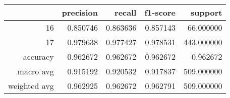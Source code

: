 \begin{tabular}{rrrrr}
\toprule
 & precision & recall & f1-score & support \\
\midrule
16 & 0.850746 & 0.863636 & 0.857143 & 66.000000 \\
17 & 0.979638 & 0.977427 & 0.978531 & 443.000000 \\
accuracy & 0.962672 & 0.962672 & 0.962672 & 0.962672 \\
macro avg & 0.915192 & 0.920532 & 0.917837 & 509.000000 \\
weighted avg & 0.962925 & 0.962672 & 0.962791 & 509.000000 \\
\bottomrule
\end{tabular}
